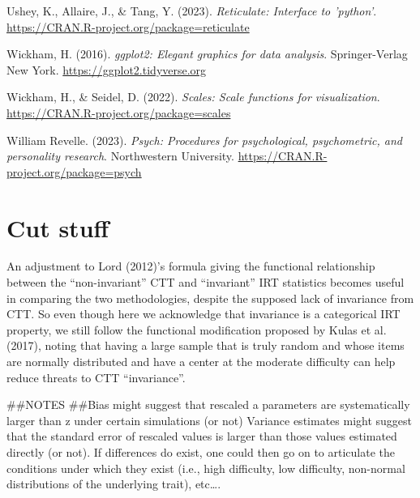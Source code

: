 \documentclass[
  man]{apa6}
\newlength{\cslhangindent}
\newlength{\cslentryspacingunit} %
\newenvironment{CSLReferences}[2] %
 {%
  \setlength{\parindent}{0pt}
  \ifodd #1
  \let\oldpar\par
  \def\par{\hangindent=\cslhangindent\oldpar}
  \fi
  \setlength{\parskip}{#2\cslentryspacingunit}
 }%
 {}
\begin{document}
\begin{CSLReferences}{1}{0}
\leavevmode{}%
Ushey, K., Allaire, J., \& Tang, Y. (2023). \emph{Reticulate: Interface to 'python'}. \url{https://CRAN.R-project.org/package=reticulate}

\leavevmode{}%
Wickham, H. (2016). \emph{ggplot2: Elegant graphics for data analysis}. Springer-Verlag New York. \url{https://ggplot2.tidyverse.org}

\leavevmode{}%
Wickham, H., \& Seidel, D. (2022). \emph{Scales: Scale functions for visualization}. \url{https://CRAN.R-project.org/package=scales}

\leavevmode{}%
William Revelle. (2023). \emph{Psych: Procedures for psychological, psychometric, and personality research}. Northwestern University. \url{https://CRAN.R-project.org/package=psych}

\end{CSLReferences}

\endgroup

\hypertarget{appendix-appendices}{%
\appendix}


\hypertarget{cut-stuff}{%
\section{Cut stuff}\label{cut-stuff}}

An adjustment to Lord (2012)'s formula giving the functional relationship between the ``non-invariant'' CTT and ``invariant'' IRT statistics becomes useful in comparing the two methodologies, despite the supposed lack of invariance from CTT. So even though here we acknowledge that invariance is a categorical IRT property, we still follow the functional modification proposed by Kulas et al. (2017), noting that having a large sample that is truly random and whose items are normally distributed and have a center at the moderate difficulty can help reduce threats to CTT ``invariance''.

\#\#NOTES
\#\#Bias might suggest that rescaled a parameters are systematically larger than z under certain simulations (or not) Variance estimates might suggest that the standard error of rescaled values is larger than those values estimated directly (or not). If differences do exist, one could then go on to articulate the conditions under which they exist (i.e., high difficulty, low difficulty, non-normal distributions of the underlying trait), etc\ldots.
\end{document}
